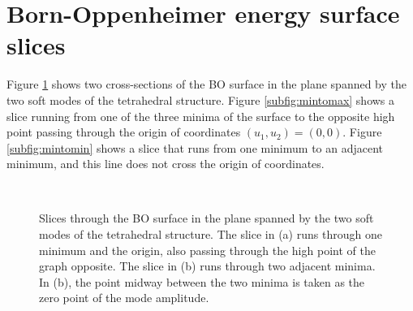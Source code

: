 \documentclass[aps,pra,onecolumn,superscriptaddress]{revtex4}
\begin{document}
\section{Born-Oppenheimer energy surface slices}

Figure \ref{fig:CrossSections} shows two cross-sections of the BO surface in the plane spanned by the two soft modes of the tetrahedral structure. Figure \ref{subfig:mintomax} shows a slice running from one of the three minima of the surface to the opposite high point passing through the origin of coordinates $(u_1,u_2)=(0,0)$. Figure \ref{subfig:mintomin} shows a slice that runs from one minimum to an adjacent minimum, and this line does not cross the origin of coordinates. 

\begin{figure}
\begin{center}
~
\end{center}
\caption{Slices through the BO surface in the plane spanned by the two soft modes of the tetrahedral structure. The slice in (a) runs through one minimum and the origin, also passing through the high point of the graph opposite. The slice in (b) runs through two adjacent minima. In (b), the point midway between the two minima is taken as the zero point of the mode amplitude.} \label{fig:CrossSections}
\end{figure}
\end{document}
